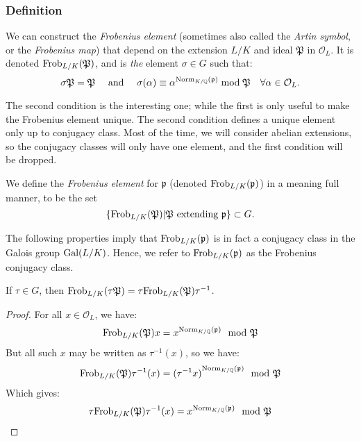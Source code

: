 \subsubsection{Definition}
We can construct the \textit{Frobenius element} (sometimes also called the \textit{Artin symbol}, or the \textit{Frobenius map}) that depend on the extension $L/K$ and ideal $\mathfrak{P}$ in $\mathcal{O}_L$.
It is denoted $\Frob{L/K}{\mathfrak{P}}$, and is \textit{the} element $\sigma \in G$ such that:
$$
\sigma \mathfrak{P} = \mathfrak{P}
\quad \text{ and } \quad
\sigma(\alpha) \equiv \alpha^{\Norm[K/\Q]{\mathfrak{p}}} \bmod{\mathfrak{P}} \quad \forall \alpha \in \mathcal{O}_L.
$$

The second condition is the interesting one; while the first is only useful to make the Frobenius element unique.
The second condition defines a unique element only up to conjugacy class.
Most of the time, we will consider abelian extensions, so the conjugacy classes will only have one element, and the first condition will be dropped.

We define the \textit{Frobenius element} for $\mathfrak{p}$ (denoted $\Frob{L/K}{\mathfrak{p}}$) in a meaning full manner, to be the set
$$
\{\Frob{L/K}{\mathfrak{P}} | \mathfrak{P} \text{ extending } \mathfrak{p}\} \subset G
.$$

The following properties imply that $\Frob{L/K}{\mathfrak{p}}$ is in fact a conjugacy class in the Galois group $\Gal{L/K}$.
Hence, we refer to $\Frob{L/K}{\mathfrak{p}}$ as the Frobenius conjugacy class.

\begin{property}
	If $\tau \in G$, then 
	$\Frob{L/K}{\mathfrak{\tau P}} = \tau \Frob{L/K}{\mathfrak{P}} \tau^{-1}$.
\end{property}
\begin{proof}
	For all $x \in \mathcal{O}_L$, we have:
	$$
	\Frob{L/K}{\mathfrak{P}}x 
	= x^{\Norm[K/\Q]{\mathfrak{p}}} \mod \mathfrak{P}
	$$
	But all such $x$ may be written as $\tau^{-1}(x)$, so we have:
	$$
	\Frob{L/K}{\mathfrak{P}} \tau^{-1}(x) 
	= {(\tau^{-1} x)}^{\Norm[K/\Q]{\mathfrak{p}}} \mod \mathfrak{P}
	$$
	Which gives:
	$$
	\tau \Frob{L/K}{\mathfrak{P}}\tau^{-1}(x) 
	= x^{\Norm[K/\Q]{\mathfrak{p}}} \mod \mathfrak{P}
	$$
\end{proof}


